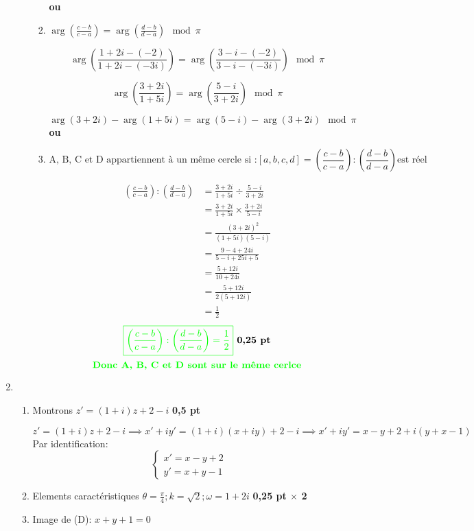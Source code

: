 \documentclass[12pt]{article}
\begin{document}
\begin{enumerate}
\begin{enumerate}
\begin{enumerate}
\textbf{ou}
\item 
$\arg \left({\frac {c-b}{c-a}}\right)=\arg \left({\frac {d-b}{d-a}}\right)\mod \pi $

\[
\arg \left({\frac {1+2i-(-2)}{1+2i-(-3i)}}\right)=\arg \left({\frac {3-i-(-2)}{3-i-(-3i)}}\right)\mod \pi
\]

\[
\arg \left({\frac {3+2i}{1+5i}}\right)=\arg \left({\frac {5-i}{3+2i}}\right)\mod \pi
\]

\[
\arg \left(3+2i\right)-\arg\left(1+5i\right)=\arg \left(5-i\right)-\arg\left(3+2i\right)\mod \pi
\]
\textbf{ou}
\item 
\[
\text{A, B, C et D appartiennent à un même cercle si :}\left[ a,b,c,d \right] =\left({\frac {c-b}{c-a}}\right):\left({\frac {d-b}{d-a}}\right) \text{est réel}
\]

\begin{align*}
\left({\frac {c-b}{c-a}}\right):\left({\frac {d-b}{d-a}}\right)&=\frac {3+2i}{1+5i} \div \frac {5-i}{3+2i}\\
																&=\frac {3+2i}{1+5i}\times \frac {3+2i}{5-i}\\																		&=\frac {(3+2i)^{2}}{(1+5i)(5-i)}\\
																&=\frac {9-4+24i}{5-i+25i+5}\\
																&=\frac {5+12i}{10+24i}\\
																&=\frac {5+12i}{2(5+12i)}\\
																&=\frac {1}{2}
\end{align*}
\[
\textcolor{green}{\boxed{\left({\frac {c-b}{c-a}}\right):\left({\frac {d-b}{d-a}}\right)=\frac {1}{2}}}\textbf{ 0,25 pt}
\]
\[
\textcolor{green}{\textbf{Donc A, B, C et D sont sur le même cerlce}}
\]

\end{enumerate}

\end{enumerate}
\item 
\begin{enumerate}
\item Montrons $z'=(1+i)z+2-i$ \textbf{ 0,5 pt}

$z'=(1+i)z+2-i\implies x'+iy'=(1+i)(x+iy)+2-i\implies x'+iy'=x-y+2+i(y+x-1)$
Par identification:
\[\begin{cases}
x'=x-y+2\\
y'=x+y-1
\end{cases}\]
\item Elements caractéristiques
$\theta=\frac{\pi}{4}; k=\sqrt{2}; \omega=1+2i$ \textbf{ 0,25 pt $\times$ 2}
\item Image de (D): $x+y+1=0$


\end{enumerate}
\end{enumerate}
\end{document}
